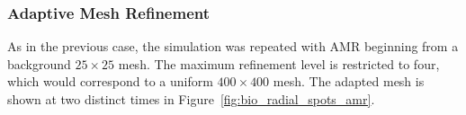 \clearpage
\subsubsection{Adaptive Mesh Refinement}
As in the previous case, the simulation was repeated with AMR beginning from a background $25\times 25$ mesh.  The maximum refinement level is restricted to four, which would correspond to a uniform $400 \times 400$ mesh.  The adapted mesh is shown at two distinct times in Figure~\ref{fig:bio_radial_spots_amr}.
\begin{figure}[hbtp]
  \begin{center}
     \\

\end{center}
\end{figure}
